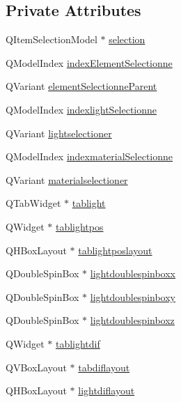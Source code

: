\subsection*{Private Attributes}
\begin{DoxyCompactItemize}
\item 
Q\+Item\+Selection\+Model $\ast$ \hyperlink{class_mondock_aa0a94c4bfce0d7d4f2547da10d365275}{selection}
\item 
Q\+Model\+Index \hyperlink{class_mondock_a48e5355dbb076ca71a13e42172f342ca}{index\+Element\+Selectionne}
\item 
Q\+Variant \hyperlink{class_mondock_a5a0f5cf7817eee757956874e3bec2043}{element\+Selectionne\+Parent}
\item 
Q\+Model\+Index \hyperlink{class_mondock_ac8fa555c082f94d22d369eed852f93c3}{indexlight\+Selectionne}
\item 
Q\+Variant \hyperlink{class_mondock_a35acbdbc03ccc8bd255083f8499188f5}{lightselectioner}
\item 
Q\+Model\+Index \hyperlink{class_mondock_a8816860ad6351028d8d4e5b022b2b266}{indexmaterial\+Selectionne}
\item 
Q\+Variant \hyperlink{class_mondock_a09fab02186d86e999d23b4f9c667353f}{materialselectioner}
\item 
Q\+Tab\+Widget $\ast$ \hyperlink{class_mondock_aff9f46d61c662d10837346c496160ed1}{tablight}
\item 
Q\+Widget $\ast$ \hyperlink{class_mondock_af55525ced19bade9444f69f28ceb63bb}{tablightpos}
\item 
Q\+H\+Box\+Layout $\ast$ \hyperlink{class_mondock_aa1e272ef1c0db51aac8861812e367b27}{tablightposlayout}
\item 
Q\+Double\+Spin\+Box $\ast$ \hyperlink{class_mondock_a16569a61106b1c9d6506d1d2a2600759}{lightdoublespinboxx}
\item 
Q\+Double\+Spin\+Box $\ast$ \hyperlink{class_mondock_a5829d9ba58222d9ec1905d9b81efeea2}{lightdoublespinboxy}
\item 
Q\+Double\+Spin\+Box $\ast$ \hyperlink{class_mondock_a7f9c9c2b765d28670aac280b38773ee9}{lightdoublespinboxz}
\item 
Q\+Widget $\ast$ \hyperlink{class_mondock_a7e42b87b7c1088da35395d5f1ef690d8}{tablightdif}
\item 
Q\+V\+Box\+Layout $\ast$ \hyperlink{class_mondock_a2691df29ebeefa273d759a15eb4c9f51}{tabdiflayout}
\item 
Q\+H\+Box\+Layout $\ast$ \hyperlink{class_mondock_a82bd5ea86bfd95368bdef210a807b1c4}{lightdiflayout}

\end{DoxyCompactItemize}

